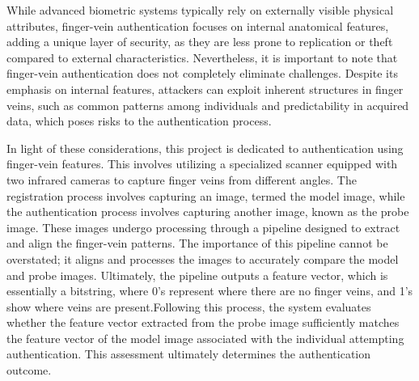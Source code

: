While advanced biometric systems typically rely on externally visible physical attributes, finger-vein authentication focuses on internal anatomical features, adding a unique layer of security, as they are less prone to replication or theft compared to external characteristics. Nevertheless, it is important to note that finger-vein authentication does not completely eliminate challenges. Despite its emphasis on internal features, attackers can exploit inherent structures in finger veins, such as common patterns among individuals and predictability in acquired data, which poses risks to the authentication process.


In light of these considerations, this project is dedicated to authentication using finger-vein features.
This involves utilizing a specialized scanner equipped with two infrared cameras to capture finger veins from different angles.
The registration process involves capturing an image, termed the model image, while the authentication process involves capturing another image, known as the probe image. These images undergo processing through a pipeline designed to extract and align the finger-vein patterns. The importance of this pipeline cannot be overstated; it aligns and processes the images to accurately compare the model and probe images.
Ultimately, the pipeline outputs a feature vector, which is essentially a bitstring, where 0's represent where there are no finger veins, and 1's show where veins are present.Following this process, the system evaluates whether the feature vector extracted from the probe image sufficiently matches the feature vector of the model image associated with the individual attempting authentication. This assessment ultimately determines the authentication outcome.



